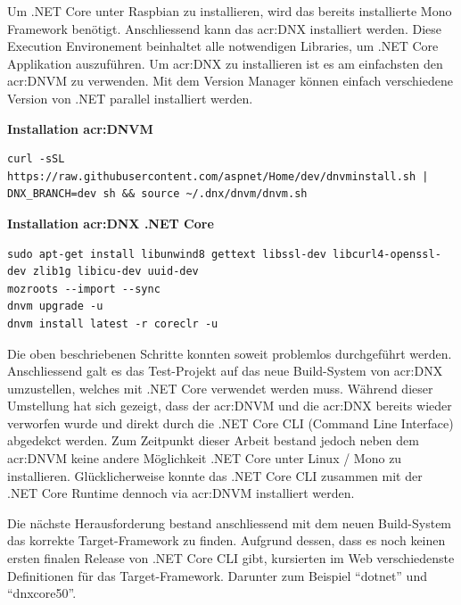 Um .NET Core unter Raspbian zu installieren, wird das bereits installierte Mono Framework benötigt. Anschliessend kann das \gls{acr:DNX} installiert werden. Diese Execution Environement beinhaltet alle notwendigen Libraries, um .NET Core Applikation auszuführen. Um  \gls{acr:DNX} zu installieren ist es am einfachsten den \gls{acr:DNVM} zu verwenden. Mit dem Version Manager können einfach verschiedene Version von .NET parallel installiert werden. 

\textbf{Installation \gls{acr:DNVM}} \\
\begin{lstlisting}
curl -sSL https://raw.githubusercontent.com/aspnet/Home/dev/dnvminstall.sh | DNX_BRANCH=dev sh && source ~/.dnx/dnvm/dnvm.sh
\end{lstlisting}

\textbf{Installation  \gls{acr:DNX} .NET Core} \\
\begin{lstlisting}
sudo apt-get install libunwind8 gettext libssl-dev libcurl4-openssl-dev zlib1g libicu-dev uuid-dev
mozroots --import --sync
dnvm upgrade -u
dnvm install latest -r coreclr -u
\end{lstlisting}

Die oben beschriebenen Schritte konnten soweit problemlos durchgeführt werden. Anschliessend galt es das Test-Projekt auf das neue Build-System von  \gls{acr:DNX} umzustellen, welches mit .NET Core verwendet werden muss. Während dieser Umstellung hat sich gezeigt, dass der \gls{acr:DNVM} und die  \gls{acr:DNX} bereits wieder verworfen wurde und direkt durch die .NET Core CLI (Command Line Interface) abgedekct werden\footnotemark[1]. Zum Zeitpunkt dieser Arbeit bestand jedoch neben dem \gls{acr:DNVM} keine andere Möglichkeit .NET Core unter Linux / Mono zu installieren. Glücklicherweise konnte das .NET Core CLI zusammen mit der .NET Core Runtime dennoch via \gls{acr:DNVM} installiert werden.


Die nächste Herausforderung bestand anschliessend mit dem neuen Build-System das korrekte Target-Framework zu finden. Aufgrund dessen, dass es noch keinen ersten finalen Release von .NET Core CLI gibt, kursierten im Web verschiedenste Definitionen für das Target-Framework. Darunter zum Beispiel "`dotnet"' und "`dnxcore50"'.

